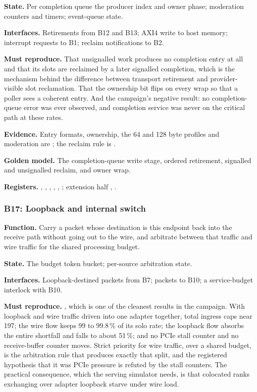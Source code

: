 \textbf{State.} Per completion queue the producer index and owner phase;
moderation counters and timers; event-queue state.

\textbf{Interfaces.} Retirements from B12 and B13; AXI4 write to host memory;
interrupt requests to B1; reclaim notifications to B2.

\textbf{Must reproduce.} That unsignalled work produces no completion entry at
all and that its slots are reclaimed by a later signalled completion, which is
the mechanism behind the difference between transport retirement and
provider-visible slot reclamation. That the ownership bit flips on every wrap so
that a poller sees a coherent entry. And the campaign's negative result: no
completion-queue error was ever observed, and completion service was never on
the critical path at these rates.

\textbf{Evidence.} Entry formats, ownership, the 64 and 128 byte profiles and
moderation are \evdoc{}; the reclaim rule is \evdrv{}.

\textbf{Golden model.} The completion-queue write stage, ordered retirement,
signalled and unsignalled reclaim, and owner wrap.

{\raggedright
\textbf{Registers.} , ,
, , ,
; extension half ,
.\par}

\subsubsection{B17: Loopback and internal switch}

\textbf{Function.} Carry a packet whose destination is this endpoint back into
the receive path without going out to the wire, and arbitrate between that
traffic and wire traffic for the shared processing budget.

\textbf{State.} The budget token bucket; per-source arbitration state.

\textbf{Interfaces.} Loopback-destined packets from B7; packets to B10; a
service-budget interlock with B10.

\textbf{Must reproduce.} , which is one of the cleanest results in the
campaign. With loopback and wire traffic driven into one adapter together,
total ingress caps near 197\Gbps{}; the wire flow keeps 99 to 99.8\,\% of its
solo rate; the loopback flow absorbs the entire shortfall and falls to about
51\,\%; and no PCIe stall counter and no receive-buffer counter moves. Strict
priority for wire traffic, over a shared budget, is the arbitration rule that
produces exactly that split, and the registered hypothesis that it was PCIe
pressure is refuted by the stall counters. The practical consequence, which the
serving simulator needs, is that colocated ranks exchanging over adapter
loopback starve under wire load.

